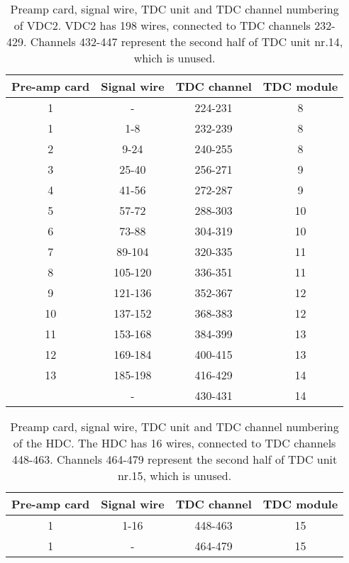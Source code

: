 \documentclass[11pt]{report}
\begin{document}
\begin{table}[!ht]
\centering
\begin{tabular}{|c|c|c|c|}
\hline
Pre-amp card & Signal wire & TDC channel & TDC module\\ 
\hline
\hline
1 & -       & 224-231  & 8 \\
1 & 1-8     & 232-239  & 8 \\
2 & 9-24    & 240-255  & 8 \\
3 & 25-40   & 256-271  & 9 \\
4 & 41-56   & 272-287  & 9 \\
5 & 57-72   & 288-303  & 10 \\
6 & 73-88   & 304-319  & 10 \\
7 & 89-104  & 320-335  & 11 \\
8 & 105-120 & 336-351  & 11 \\
9 & 121-136 & 352-367  & 12 \\
10 & 137-152 & 368-383 & 12 \\
11 & 153-168 & 384-399 & 13 \\
12 & 169-184 & 400-415 & 13 \\
13 & 185-198 & 416-429 & 14 \\
   & -       & 430-431 & 14 \\
\hline
\end{tabular}
\caption{Preamp card, signal wire, TDC unit and TDC channel numbering of VDC2.
VDC2 has 198 wires, connected to TDC channels 232-429. Channels 432-447
represent the second half of TDC unit nr.14, which is unused.}
\label{table:tdc-chan-numbering-vdc2}
\end{table}


\begin{table}[!ht]
\centering
\begin{tabular}{|c|c|c|c|}
\hline
Pre-amp card & Signal wire & TDC channel & TDC module\\ 
\hline
\hline
1 & 1-16  & 448-463  & 15 \\
1 & -     & 464-479  & 15 \\
\hline
\end{tabular}
\caption{Preamp card, signal wire, TDC unit and TDC channel numbering of the HDC.
The HDC has 16 wires, connected to TDC channels 448-463. Channels 464-479
represent the second half of TDC unit nr.15, which is unused.}
\label{table:tdc-chan-numbering-hdc}
\end{table}
\end{document}
